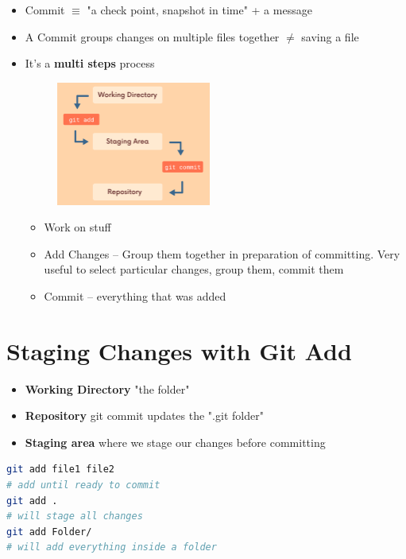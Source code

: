 \documentclass{report}
\begin{document}
\begin{itemize}
	\item Commit $\equiv$ "a check point, snapshot in time" + a message
	\item A Commit groups changes on multiple files together $\not=$ saving a file
	\item It's a \textbf{multi steps} process
			\begin{figure}[H] 
	 		\centering 
	 		\includegraphics[width=2in]{screenshots/2022-06-26T23-07-02Z.png} 
		 \end{figure}
		\begin{itemize}
			\item Work on stuff
			\item Add Changes -- Group them together in preparation of committing.
				Very useful to select particular changes, group them, commit them
			\item Commit -- everything that was added

		\end{itemize}
\end{itemize}


\section{Staging Changes with Git Add}

\begin{itemize}
	\item \textbf{Working Directory} "the folder" 
	\item \textbf{Repository} git commit updates the ".git folder" 
	\item \textbf{Staging area} where we stage our changes before committing 
\end{itemize}

\begin{tcolorbox}[title=Adding,colback=backcolour]
\begin{lstlisting}[language=bash]
git add file1 file2
# add until ready to commit
git add .
# will stage all changes
git add Folder/
# will add everything inside a folder
\end{lstlisting}
\end{tcolorbox}
\end{document}
